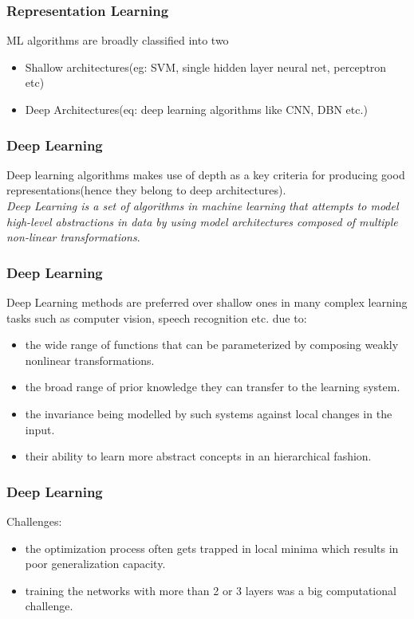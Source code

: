 \documentclass[a4paper,compress,svgnames]{beamer}
\begin{document}
\begin{frame}
\frametitle{Representation Learning}
ML algorithms are broadly classified into two\\
\vspace{0.2in}
\begin{itemize}
\item Shallow architectures(eg: SVM, single hidden layer neural net, perceptron etc)
\item Deep Architectures(eq: deep learning algorithms like CNN, DBN etc.)
\end{itemize}
\end{frame}

\begin{frame}
\frametitle{Deep Learning}
Deep learning algorithms makes use of depth as a key criteria for producing good representations(hence they belong to deep architectures).\\
\vspace{0.2in}
\textit{Deep Learning is a set of algorithms in machine learning that attempts to model high-level abstractions in data by using model architectures composed of multiple non-linear transformations}.
\end{frame}

\begin{frame}
\frametitle{Deep Learning}
Deep Learning methods are preferred over shallow ones in many complex learning tasks such as computer vision, speech recognition etc. due to:\\
\vspace{0.1in}
\begin{itemize}
\item the wide range of functions that can be parameterized by composing weakly nonlinear transformations.
\item the broad range of prior knowledge they can transfer to the learning system.
\item the invariance being modelled by such systems against local changes in the input.
\item their ability to learn more abstract concepts in an hierarchical fashion.
\end{itemize}
\end{frame}

\begin{frame}
\frametitle{Deep Learning}
Challenges:\\
\vspace{0.2in}
\begin{itemize}
\setlength\itemsep{1em}
\item the optimization process often gets trapped in local minima which results in poor generalization capacity.
\item training the networks with more than 2 or 3 layers was a big computational challenge.
\end{itemize}
\end{frame}
\end{document}
